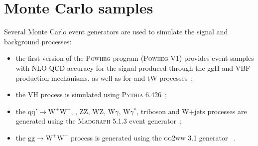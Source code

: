 %
%
%
%


\section{Monte Carlo samples\label{subsec:MC}}

Several Monte Carlo event generators are used to simulate the signal and background processes:
\begin{itemize}
\item the first version of the \textsc{Powheg} program (\textsc{Powheg V1}) provides event samples with NLO QCD accuracy for the \hww signal produced through the ggH and VBF production mechanisms, as well as for \ttbar and tW processes~\cite{Alioli:2011as};
\item the VH process is simulated using \textsc{Pythia 6.426}~\cite{Sjostrand:2006za};
\item the $\mathrm{q\bar{q}'} \to \mathrm{W^{+}W^{-}}$, \dyll, ZZ, WZ, W$\gamma$, W$\gamma^*$, triboson and W+jets processes are generated using
the \textsc{Madgraph 5.1.3} event generator~\cite{Alwall:2014hca};
\item the $\mathrm{gg\to W^{+}W^{-}}$ process is generated using the \textsc{gg2ww} 3.1 generator ~\cite{Binoth:2006mf}.
\end{itemize}

